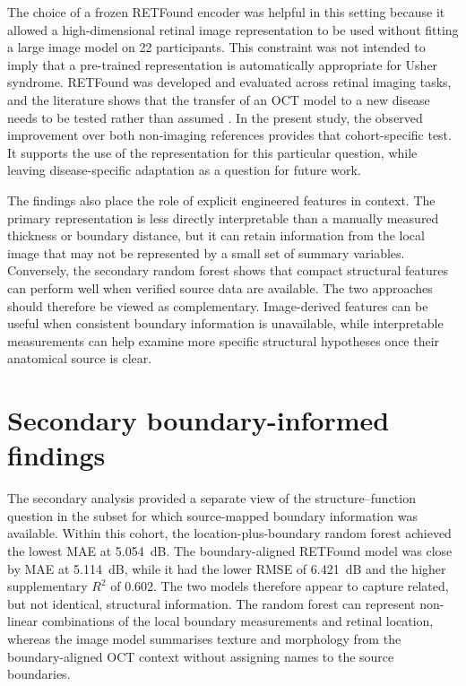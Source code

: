 The choice of a frozen RETFound encoder was helpful in this setting because it allowed a high-dimensional retinal image representation to be used without fitting a large image model on 22 participants. This constraint was not intended to imply that a pre-trained representation is automatically appropriate for Usher syndrome. RETFound was developed and evaluated across retinal imaging tasks, and the literature shows that the transfer of an OCT model to a new disease needs to be tested rather than assumed \citep{Zhou2023RETFound,Loo2022}. In the present study, the observed improvement over both non-imaging references provides that cohort-specific test. It supports the use of the representation for this particular question, while leaving disease-specific adaptation as a question for future work.

The findings also place the role of explicit engineered features in context. The primary representation is less directly interpretable than a manually measured thickness or boundary distance, but it can retain information from the local image that may not be represented by a small set of summary variables. Conversely, the secondary random forest shows that compact structural features can perform well when verified source data are available. The two approaches should therefore be viewed as complementary. Image-derived features can be useful when consistent boundary information is unavailable, while interpretable measurements can help examine more specific structural hypotheses once their anatomical source is clear.

\section{Secondary boundary-informed findings}

The secondary analysis provided a separate view of the structure--function question in the subset for which source-mapped boundary information was available. Within this cohort, the location-plus-boundary random forest achieved the lowest MAE at 5.054~dB. The boundary-aligned RETFound model was close by MAE at 5.114~dB, while it had the lower RMSE of 6.421~dB and the higher supplementary $R^2$ of 0.602. The two models therefore appear to capture related, but not identical, structural information. The random forest can represent non-linear combinations of the local boundary measurements and retinal location, whereas the image model summarises texture and morphology from the boundary-aligned OCT context without assigning names to the source boundaries.

